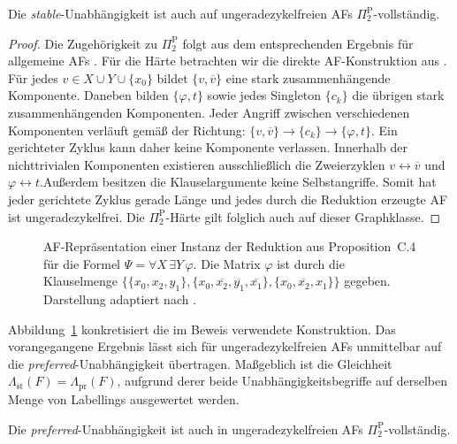 \begin{Proposition}
    \label{prop:ocf-af-ci-st-pi^2}
    Die \emph{stable}-Unabhängigkeit ist auch auf ungeradezykelfreien AFs
    \(\Pi_2^{\mathrm{P}}\)-vollständig.
\end{Proposition}

\begin{proof}
    \label{pr:ocf-af-ci-st-pi^2-is-correct}
    Die Zugehörigkeit zu \(\Pi_2^{\mathrm{P}}\) folgt aus dem entsprechenden
    Ergebnis für allgemeine AFs
    \parencite[Proposition~4.10]{bluemel:2025:independence-aba}.
    Für die Härte betrachten wir die direkte AF-Konstruktion aus
    \textcite[Proposition~C.4]{bluemel:2025:independence-aba}.
    Für jedes \(v\in X\cup Y\cup\{x_0\}\) bildet
    \(\{v,\overline v\}\) eine stark zusammenhängende Komponente.
    Daneben bilden \(\{\varphi,t\}\) sowie jedes Singleton
    \(\{c_k\}\) die übrigen stark zusammenhängenden Komponenten.
    Jeder Angriff zwischen verschiedenen Komponenten verläuft gemäß der
    Richtung:
    \(
        \{v,\overline v\}
        \rightarrow
        \{c_k\}
        \rightarrow
        \{\varphi,t\}.
    \)
    Ein gerichteter Zyklus kann daher keine Komponente verlassen. Innerhalb
    der nichttrivialen Komponenten existieren ausschließlich die Zweierzyklen
    \(v\leftrightarrow\overline v\) und
    \(\varphi\leftrightarrow t\).Außerdem besitzen die Klauselargumente keine
    Selbstangriffe. Somit hat jeder gerichtete Zyklus gerade Länge und jedes
    durch die Reduktion erzeugte AF ist ungeradezykelfrei. Die
    \(\Pi_2^{\mathrm{P}}\)-Härte gilt folglich auch auf dieser Graphklasse.
\end{proof}

\begin{figure}
    \centering
    \resizebox{\textwidth}{!}{
        
    }
    \caption[Reduktion für \emph{stable}-Unabhängigkeit]{
    AF-Repräsentation einer Instanz der Reduktion aus Proposition~C.4
    für die Formel \(\Psi=\forall X\,\exists Y\,\varphi\).
    Die Matrix \(\varphi\) ist durch die Klauselmenge
    \(\{\{x_0,x_2,y_1\},
    \{x_0,\overline{x_2},\overline{y_1},\overline{x_1}\},
    \{x_0,\overline{x_2},x_1\}\}\)
    gegeben. Darstellung adaptiert nach
    \cite{bluemel:2025:independence-aba}.
    }   
    \label{fig:reduktion-stable}
\end{figure}

Abbildung~\ref{fig:reduktion-stable} konkretisiert die im Beweis verwendete
Konstruktion. 
Das vorangegangene Ergebnis lässt sich für ungeradezykelfreien AFs unmittelbar auf die \emph{preferred}-Unabhängigkeit übertragen. 
Maßgeblich ist die Gleichheit \(\Lambda_{\mathrm{st}}(F)=\Lambda_{\mathrm{pr}}(F)\), 
aufgrund derer beide Unabhängigkeitsbegriffe auf derselben Menge von Labellings ausgewertet werden.
\begin{Proposition}
    \label{prop:ocf-af-ci-pr-pi^2-c}
    Die \emph{preferred}-Unabhängigkeit ist auch in ungeradezykelfreien AFs \(\Pi_2^{\mathrm{P}}\)-vollständig.
\end{Proposition}

